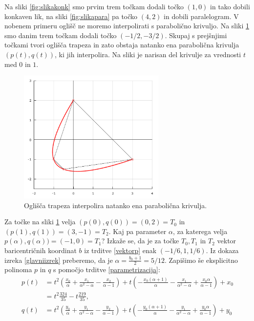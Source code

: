 \documentclass[mat1]{fmfdelo}
\newcommand{\al}{\alpha}
\begin{document}
\begin{primer}
%
Na sliki \ref{fig:slikakonk} smo prvim trem točkam dodali točko $(1,0)$ in tako dobili konkaven lik, na sliki \ref{fig:slikapara} pa točko $(4,2)$ in dobili paralelogram. V nobenem primeru oglišč ne moremo interpolirati s parabolično krivuljo. Na sliki \ref{fig:slikatrap} smo danim trem točkam dodali točko $(-1/2, - 3/2)$. Skupaj s prejšnjimi točkami tvori oglišča trapeza in zato obstaja natanko ena parabolična krivulja $(p(t), q(t))$, ki jih interpolira. Na sliki je narisan del krivulje za vrednosti $t$ med $0$ in $1$.
%
\begin{figure}[h!]
  \centering
      \includegraphics[width=0.65\textwidth]{otrap}
  \caption{Oglišča trapeza interpolira natanko ena parabolična krivulja.}
  \label{fig:slikatrap}
  \end{figure}
%
Za točke na sliki \ref{fig:slikatrap} velja $(p(0), q(0)) = (0,2) = T_0$ in $(p(1), q(1)) = (3, -1) = T_2$. Kaj pa parameter $\al$, za katerega velja $p(\al), q(\al)) = (-1, 0) = T_1$? Izkaže se, da je za točke $T_0, T_1$ in $T_2$ vektor baricentričnih koordinat $b$ iz trditve \ref{vektorp} enak $(-1/6, 1, 1/6)$. Iz dokaza izreka \ref{glavniizrek} preberemo, da je $\al = \frac{b_0 + 1}{2} = 5/12$. Zapišimo še eksplicitno polinoma $p$ in $q$ s pomočjo trditve \ref{parametrizacija}:
%
\begin{align*}
p(t) &= t^2 ( \frac{x_0}{\al} + \frac{x_1}{\al^2 - \al} - \frac{x_2}{\al -1} ) + t(- \frac{x_0(\al + 1)}{\al} - \frac{x_1}{\al^2 - \al} + \frac{x_0 \al}{\al - 1}) + x_0 \\
       &= t^2 \frac{324}{35} - t \frac{219}{35}, \\
q(t) &= t^2 ( \frac{y_0}{\al} + \frac{y_1}{\al^2 - \al} - \frac{y_2}{\al -1} ) + t(- \frac{y_0(\al + 1)}{\al} - \frac{y_1}{\al^2 - \al} + \frac{y_0 \al}{\al - 1}) + y_0  \\

\end{align*}
\end{primer}
\end{document}
